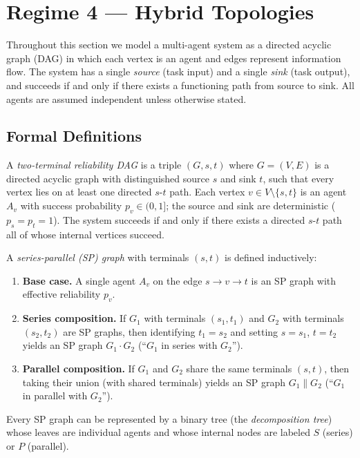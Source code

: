 \section{Regime 4 --- Hybrid Topologies}
\label{sec:regime4}


Throughout this section we model a multi-agent system as a directed acyclic graph
(DAG) in which each vertex is an agent and edges represent information flow.  The
system has a single \emph{source} (task input) and a single \emph{sink} (task output),
and succeeds if and only if there exists a functioning path from source to sink.
All agents are assumed independent unless otherwise stated.

\subsection{Formal Definitions}

\begin{definition}
\label{def:r4-reliability-dag}
A \emph{two-terminal reliability DAG} is a triple $(G, s, t)$ where
$G = (V, E)$ is a directed acyclic graph with distinguished source $s$ and sink
$t$, such that every vertex lies on at least one directed $s$-$t$ path.
Each vertex $v \in V \setminus \{s,t\}$ is an agent $A_v$ with success probability
$p_v \in (0,1]$; the source and sink are deterministic ($p_s = p_t = 1$).
The system succeeds if and only if there exists a directed $s$-$t$ path all of whose
internal vertices succeed.
\end{definition}

\begin{definition}
\label{def:r4-sp-graph}
A \emph{series-parallel (SP) graph} with terminals $(s,t)$ is defined inductively:
\begin{enumerate}
  \item \textbf{Base case.} A single agent $A_v$ on the edge $s \to v \to t$
    is an SP graph with effective reliability $p_v$.
  \item \textbf{Series composition.} If $G_1$ with terminals $(s_1, t_1)$ and
    $G_2$ with terminals $(s_2, t_2)$ are SP graphs, then identifying $t_1 = s_2$
    and setting $s = s_1$, $t = t_2$ yields an SP graph $G_1 \cdot G_2$
    (``$G_1$ in series with $G_2$'').
  \item \textbf{Parallel composition.} If $G_1$ and $G_2$ share the same terminals
    $(s, t)$, then taking their union (with shared terminals) yields an SP graph
    $G_1 \| G_2$ (``$G_1$ in parallel with $G_2$'').
\end{enumerate}
Every SP graph can be represented by a binary tree (the \emph{decomposition tree})
whose leaves are individual agents and whose internal nodes are labeled $S$ (series)
or $P$ (parallel).
\end{definition}

